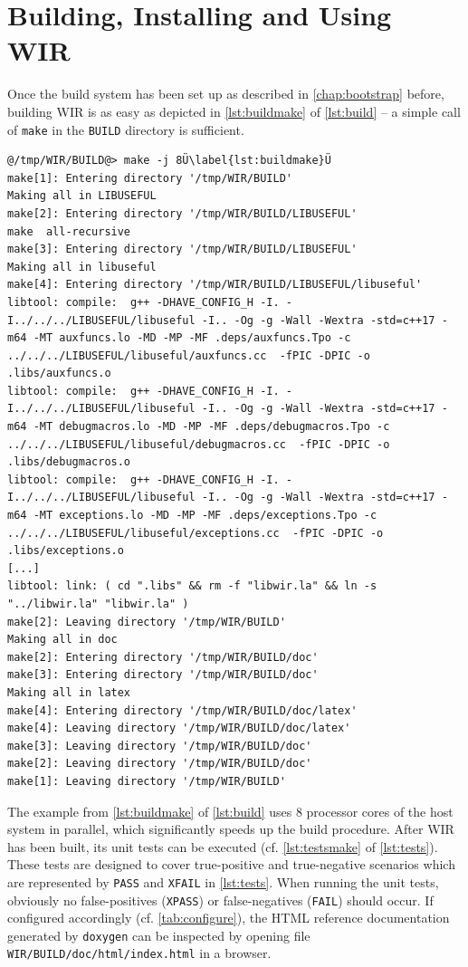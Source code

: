 \chapter{Building, Installing and Using WIR}
\label{chap:build}
\renewcommand{\sectiontitle}{}

Once the build system has been set up as described in \cref{chap:bootstrap} before, building \gls{WIR} is as easy as depicted in \cref{lst:buildmake} of \cref{lst:build} -- a simple call of \texttt{make} in the \texttt{BUILD} directory is sufficient.

\begin{lstlisting}[style=commandline,float=h,caption={WIR Build using \texttt{make}},label=lst:build]
@/tmp/WIR/BUILD@> make -j 8Ü\label{lst:buildmake}Ü
make[1]: Entering directory '/tmp/WIR/BUILD'
Making all in LIBUSEFUL
make[2]: Entering directory '/tmp/WIR/BUILD/LIBUSEFUL'
make  all-recursive
make[3]: Entering directory '/tmp/WIR/BUILD/LIBUSEFUL'
Making all in libuseful
make[4]: Entering directory '/tmp/WIR/BUILD/LIBUSEFUL/libuseful'
libtool: compile:  g++ -DHAVE_CONFIG_H -I. -I../../../LIBUSEFUL/libuseful -I.. -Og -g -Wall -Wextra -std=c++17 -m64 -MT auxfuncs.lo -MD -MP -MF .deps/auxfuncs.Tpo -c ../../../LIBUSEFUL/libuseful/auxfuncs.cc  -fPIC -DPIC -o .libs/auxfuncs.o
libtool: compile:  g++ -DHAVE_CONFIG_H -I. -I../../../LIBUSEFUL/libuseful -I.. -Og -g -Wall -Wextra -std=c++17 -m64 -MT debugmacros.lo -MD -MP -MF .deps/debugmacros.Tpo -c ../../../LIBUSEFUL/libuseful/debugmacros.cc  -fPIC -DPIC -o .libs/debugmacros.o
libtool: compile:  g++ -DHAVE_CONFIG_H -I. -I../../../LIBUSEFUL/libuseful -I.. -Og -g -Wall -Wextra -std=c++17 -m64 -MT exceptions.lo -MD -MP -MF .deps/exceptions.Tpo -c ../../../LIBUSEFUL/libuseful/exceptions.cc  -fPIC -DPIC -o .libs/exceptions.o
[...]
libtool: link: ( cd ".libs" && rm -f "libwir.la" && ln -s "../libwir.la" "libwir.la" )
make[2]: Leaving directory '/tmp/WIR/BUILD'
Making all in doc
make[2]: Entering directory '/tmp/WIR/BUILD/doc'
make[3]: Entering directory '/tmp/WIR/BUILD/doc'
Making all in latex
make[4]: Entering directory '/tmp/WIR/BUILD/doc/latex'
make[4]: Leaving directory '/tmp/WIR/BUILD/doc/latex'
make[3]: Leaving directory '/tmp/WIR/BUILD/doc'
make[2]: Leaving directory '/tmp/WIR/BUILD/doc'
make[1]: Leaving directory '/tmp/WIR/BUILD'
\end{lstlisting}

The example from \cref{lst:buildmake} of \cref{lst:build} uses 8 processor cores of the host system in parallel, which significantly speeds up the build procedure.
After \gls{WIR} has been built, its unit tests can be executed (cf. \cref{lst:testsmake} of \cref{lst:tests}).
These tests are designed to cover true-positive and true-negative scenarios which are represented by \texttt{PASS} and \texttt{XFAIL} in \cref{lst:tests}.
When running the unit tests, obviously no false-positives (\texttt{XPASS}) or false-negatives (\texttt{FAIL}) should occur.
If configured accordingly (cf. \cref{tab:configure}), the HTML reference documentation generated by \texttt{doxygen} can be inspected by opening file \texttt{WIR/BUILD/doc/html/index.html} in a browser.

